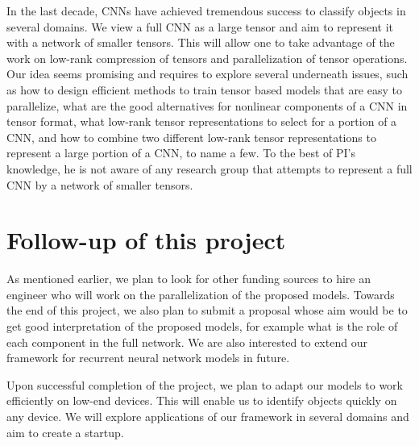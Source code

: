 \documentclass[11pt]{article}
\begin{document}
In the last decade,  CNNs have achieved tremendous success to classify objects in several domains. We view a full CNN as a large tensor and aim to represent it with a network of smaller tensors. This will allow one to take advantage of the work on low-rank compression of tensors and parallelization of tensor operations.  Our idea seems promising and requires to explore several underneath issues, such as how to design efficient methods to train tensor based models that are easy to parallelize, what are the  good alternatives for nonlinear components of a CNN in tensor format, what low-rank tensor representations to select for a portion of a CNN, and how to combine  two different low-rank tensor representations to represent a large portion of a CNN, to name a few. To the best of PI's knowledge, he is not aware of any research group that attempts to represent a full CNN by a network of smaller tensors.


\section{Follow-up of this project}
As mentioned earlier, we plan to look for other funding sources to hire an engineer who will work on the parallelization of the proposed models. Towards the end of this project, we also plan to submit a proposal whose aim would be to get good interpretation of the proposed models, for example what is the role of each component in the full network. We are also interested to extend our framework for recurrent neural network models in future. 

Upon successful completion of the project, we plan to adapt our models to work efficiently on low-end devices. This will enable us to  identify objects quickly on any device. We will explore applications of our framework in several domains and aim to create a startup.

{
\footnotesize
\small


}
\end{document}
